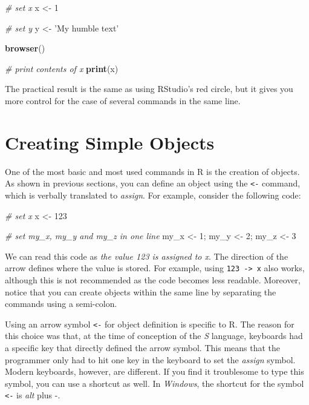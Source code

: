 \documentclass[
  12pt,
]{book}
\newenvironment{Shaded}{\begin{snugshade}}{\end{snugshade}}
\newcommand{\CommentTok}[1]{\textcolor[rgb]{0.37,0.37,0.37}{\textit{#1}}}
\newcommand{\DecValTok}[1]{\textcolor[rgb]{0.06,0.06,0.06}{#1}}
\newcommand{\KeywordTok}[1]{\textcolor[rgb]{0.27,0.27,0.27}{\textbf{#1}}}
\newcommand{\NormalTok}[1]{#1}
\newcommand{\StringTok}[1]{\textcolor[rgb]{0.5,0.5,0.5}{#1}}
\newenvironment{rmdimportant}
{\begin{importantblock}
		
	} {\end{importantblock}}
\begin{document}
\begin{Shaded}
\begin{Highlighting}[]
\CommentTok{# set x}
\NormalTok{x <-}\StringTok{ }\DecValTok{1}

\CommentTok{# set y}
\NormalTok{y <-}\StringTok{ 'My humble text'}

\KeywordTok{browser}\NormalTok{()}

\CommentTok{# print contents of x}
\KeywordTok{print}\NormalTok{(x)}
\end{Highlighting}
\end{Shaded}

The practical result is the same as using RStudio's red circle, but it gives you more control for the case of several commands in the same line.

\hypertarget{creating-simple-objects}{%
\section{Creating Simple Objects}\label{creating-simple-objects}}

One of the most basic and most used commands in R is the creation of objects. As shown in previous sections, you can define an object using the \texttt{\textless{}-} command, which is verbally translated to \emph{assign}. For example, consider the following code: 

\begin{Shaded}
\begin{Highlighting}[]
\CommentTok{# set x}
\NormalTok{x <-}\StringTok{ }\DecValTok{123}

\CommentTok{# set my_x, my_y and my_z in one line}
\NormalTok{my_x <-}\StringTok{ }\DecValTok{1}\NormalTok{; my_y <-}\StringTok{ }\DecValTok{2}\NormalTok{; my_z <-}\StringTok{ }\DecValTok{3}
\end{Highlighting}
\end{Shaded}

We can read this code as \emph{the value 123 is assigned to x}. The direction of the arrow defines where the value is stored. For example, using \texttt{123\ -\textgreater{}\ x} also works, although this is not recommended as the code becomes less readable. Moreover, notice that you can create objects within the same line by separating the commands using a semi-colon.

\begin{rmdimportant}
Using an arrow symbol \texttt{\textless{}-} for object definition is
specific to R. The reason for this choice was that, at the time of
conception of the \emph{S} language, keyboards had a specific key that
directly defined the arrow symbol. This means that the programmer only
had to hit one key in the keyboard to set the \emph{assign} symbol.
Modern keyboards, however, are different. If you find it troublesome to
type this symbol, you can use a shortcut as well. In \emph{Windows}, the
shortcut for the symbol \texttt{\textless{}-} is \emph{alt} plus -.
\end{rmdimportant}
\end{document}
